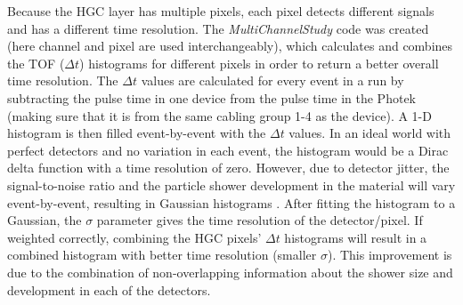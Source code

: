 \documentclass[12pt]{article}
\begin{document}
Because the HGC layer has multiple pixels, each pixel detects different signals and has a different time resolution. 
The \textit{MultiChannelStudy} code was created (here channel and pixel are used interchangeably), which calculates and combines the TOF ($\Delta t$) histograms for different pixels in order to return a better overall time resolution. 
The $\Delta t$ values are calculated for every event in a run by subtracting the pulse time in one device from the pulse time in the Photek (making sure that it is from the same cabling group 1-4 as the device). 
A 1-D histogram is then filled event-by-event with the $\Delta t$ values. 
In an ideal world with perfect detectors and no variation in each event, the histogram would be a Dirac delta function with a time resolution of zero. 
However, due to detector jitter, the signal-to-noise ratio and the particle shower development in the material will vary event-by-event, resulting in Gaussian histograms \cite{P2}. 
After fitting the histogram to a Gaussian, the $\sigma$ parameter gives the time resolution of the detector/pixel. 
If weighted correctly, combining the HGC pixels’ $\Delta t$ histograms will result in a combined histogram with better time resolution (smaller $\sigma$). 
This improvement is due to the combination of non-overlapping information about the shower size and development in each of the detectors.
\end{document}
